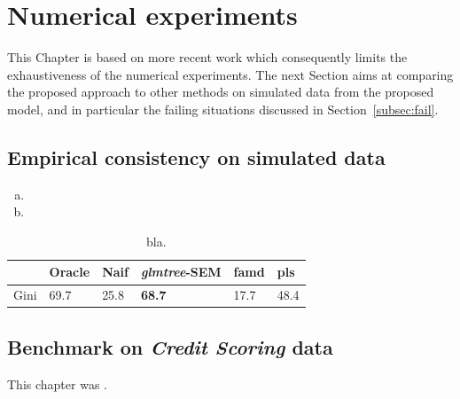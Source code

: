 \section{Numerical experiments} \label{sec:num_exp}

This Chapter is based on more recent work which consequently limits the exhaustiveness of the numerical experiments. The next Section aims at comparing the proposed approach to other methods on simulated data from the proposed model, and in particular the failing situations discussed in Section~\ref{subsec:fail}.

\subsection{Empirical consistency on simulated data} \label{subsec:num_sim}


\begin{enumerate}[(a)]
\item 
\item 
\end{enumerate}


\begin{table}[t]
\caption{\label{tab:num_exp_tree} bla.}
\centering
\begin{tabular}{ll|llll}
 & Oracle & Naif& \textit{glmtree}-SEM & \gls{famd} & \gls{pls} \\
\hline
Gini & 69.7 & 25.8 & \textbf{68.7} & 17.7 & 48.4 \\
\end{tabular}
\end{table}



\subsection{Benchmark on \textit{Credit Scoring} data}




\bigskip

This chapter was .


\printbibliography[heading=subbibliography, title=References of Chapter 5]

